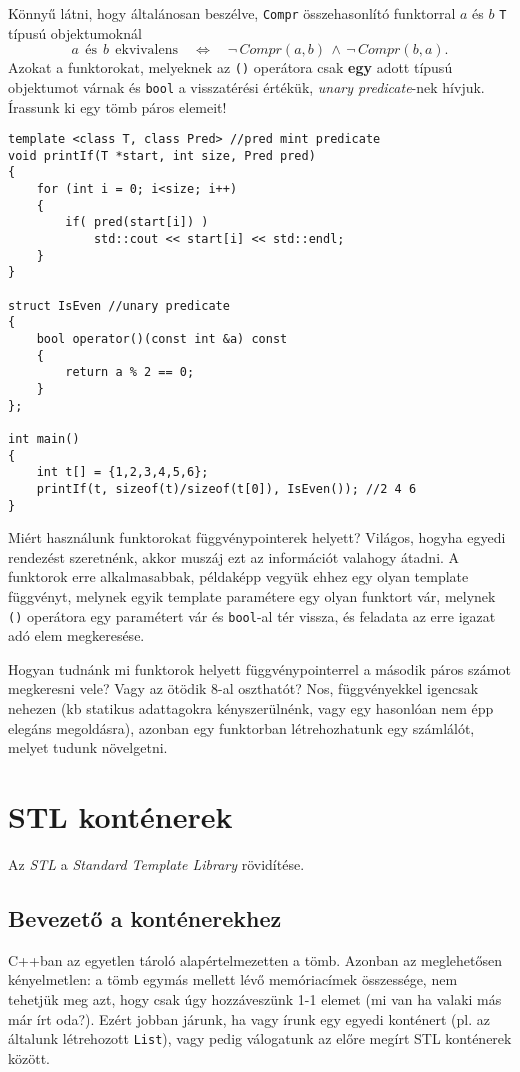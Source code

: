 \documentclass[a4paper,11.5pt,table]{article}
\begin{document}
	Könnyű látni, hogy általánosan beszélve, \texttt{Compr} összehasonlító funktorral $a$ és $b$ \texttt{T} típusú objektumoknál
	\[ a\ \ \text{és}\ \ b\ \ \text{ekvivalens}\quad \Leftrightarrow\quad \neg \,Compr(a, b)\, \wedge\, \neg \,Compr(b, a). \]
	Azokat a funktorokat, melyeknek az \texttt{()} operátora csak \textbf{egy} adott típusú objektumot várnak és \texttt{bool} a visszatérési értékük, \textit{unary predicate}-nek hívjuk. Írassunk ki egy tömb páros elemeit!
	\begin{lstlisting}
template <class T, class Pred> //pred mint predicate
void printIf(T *start, int size, Pred pred)
{
	for (int i = 0; i<size; i++)
	{
		if( pred(start[i]) )
			std::cout << start[i] << std::endl;
	}
}

struct IsEven //unary predicate
{
	bool operator()(const int &a) const
	{
		return a % 2 == 0;
	}
};

int main()
{
	int t[] = {1,2,3,4,5,6};
	printIf(t, sizeof(t)/sizeof(t[0]), IsEven()); //2 4 6
}
	\end{lstlisting}
	\begin{note}
		Miért használunk funktorokat függvénypointerek helyett? Világos, hogyha egyedi rendezést szeretnénk, akkor muszáj ezt az információt valahogy átadni. A funktorok erre alkalmasabbak, példaképp vegyük ehhez egy olyan template függvényt, melynek egyik template paramétere egy olyan funktort vár, melynek \texttt{()} operátora egy paramétert vár és \texttt{bool}-al tér vissza, és feladata az erre igazat adó elem megkeresése. 
		
		Hogyan tudnánk mi funktorok helyett függvénypointerrel a második páros számot megkeresni vele? Vagy az ötödik 8-al oszthatót? Nos, függvényekkel igencsak nehezen (kb statikus adattagokra kényszerülnénk, vagy egy hasonlóan nem épp elegáns megoldásra), azonban egy funktorban létrehozhatunk egy számlálót, melyet tudunk növelgetni.
	\end{note}
	\section{STL konténerek}
	
	Az \textit{STL} a \textit{Standard Template Library} rövidítése.
	\subsection{Bevezető a konténerekhez}
	C++ban az egyetlen tároló alapértelmezetten a tömb. Azonban az meglehetősen kényelmetlen: a tömb egymás mellett lévő memóriacímek összessége, nem tehetjük meg azt, hogy csak úgy hozzáveszünk 1-1 elemet (mi van ha valaki más már írt oda?). Ezért jobban járunk, ha vagy írunk egy egyedi konténert (pl. az általunk létrehozott \texttt{List}), vagy pedig válogatunk az előre megírt STL konténerek között.
	
\end{document}
